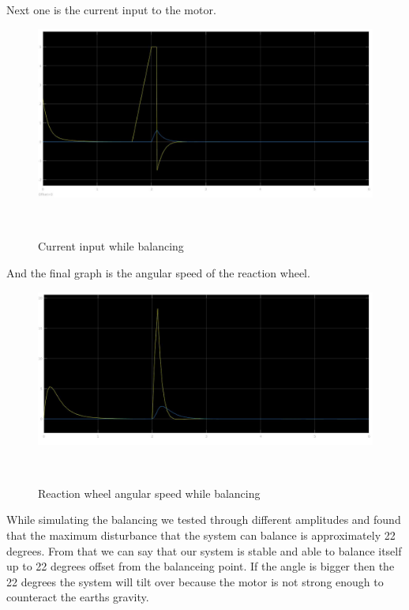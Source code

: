 Next one is the current input to the motor.
\begin{figure}[H]

	
	\centering
 	\includegraphics[width=1\textwidth]{images/curr0401.jpg}
	
	~
	\caption{Current input while balancing} 
 	\label{fig:mech} 
\end{figure}

And the final graph is the angular speed of the reaction wheel.
\begin{figure}[H]

	
	\centering
 	\includegraphics[width=1\textwidth]{images/wspeed0401.jpg}
	
	~
	\caption{Reaction wheel angular speed while balancing} 
 	\label{fig:mech} 
\end{figure}

While simulating the balancing we tested through different amplitudes and found that the maximum disturbance that the system can balance is approximately 22 degrees.
From that we can say that our system is stable and able to balance itself up to 22 degrees offset from the balanceing point.
If the angle is bigger then the 22 degrees the system will tilt over because the motor is not strong enough to counteract the earths gravity.

